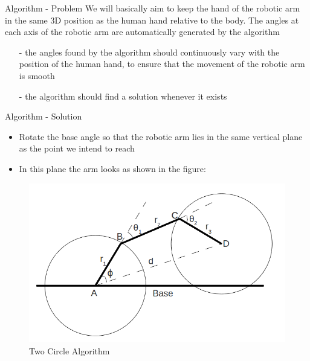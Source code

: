 \documentclass{beamer}
\begin{document}
\begin{frame}{Algorithm - Problem}
  We will basically aim to keep the hand of the robotic arm in the same 3D position as the human hand relative to the body. The angles at each axis of the robotic arm are automatically generated by the algorithm
  \begin{itemize}
  \item[-] the angles found by the algorithm should continuously vary with the position of the human hand, to ensure that the movement of the robotic arm  is smooth
  \item[-] the algorithm should find a solution whenever it exists
  \end{itemize}
\end{frame}

\begin{frame}{Algorithm - Solution}
  \begin{itemize}
  \item Rotate the base angle so that the robotic arm lies in the same vertical plane as the point we intend to reach
  \item In this plane the arm looks as shown in the figure:
  \end{itemize}
  \begin{figure}
\centerline{\includegraphics[scale=0.2]{images/twocircles.png}}
\caption{Two Circle Algorithm}
\end{figure}
\end{frame}
\end{document}
